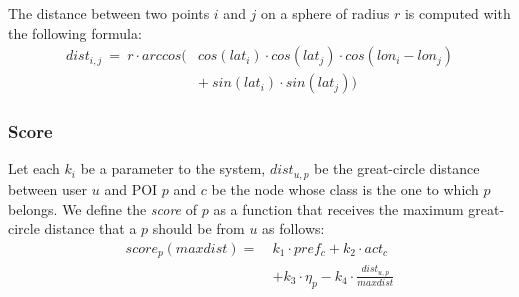 The distance between two points $i$ and $j$ on a sphere of radius $r$ is computed with the following formula:
\begin{equation} \label{eq:gc-dist}
    \begin{split}
        \scriptstyle{dist_{i,j} \ = \ r \cdot arccos (} & \scriptstyle{cos(lat_i) \cdot cos(lat_j) \cdot cos(lon_i - lon_j)} \\
                                        & \scriptstyle{+ \ sin(lat_i) \cdot sin(lat_j) )}
    \end{split}
\end{equation}

\subsubsection{Score} \label{section:score}
Let each $k_i$ be a parameter to the system, $dist_{u,p}$ be the great-circle distance between user $u$ and POI $p$ and $c$ be the node whose class is the one to which $p$ belongs. We define the \textit{score} of $p$ as a function that receives the maximum great-circle distance that a $p$ should be from $u$ as follows:
\begin{equation} \label{eq:score}
    \begin{split}
        score_p(maxdist) = \ &k_1 \cdot pref_c + k_2 \cdot act_c \\
                                        &+ k_3 \cdot \eta_p - k_4 \cdot \frac{dist_{u,p}}{maxdist}
    \end{split}
\end{equation}